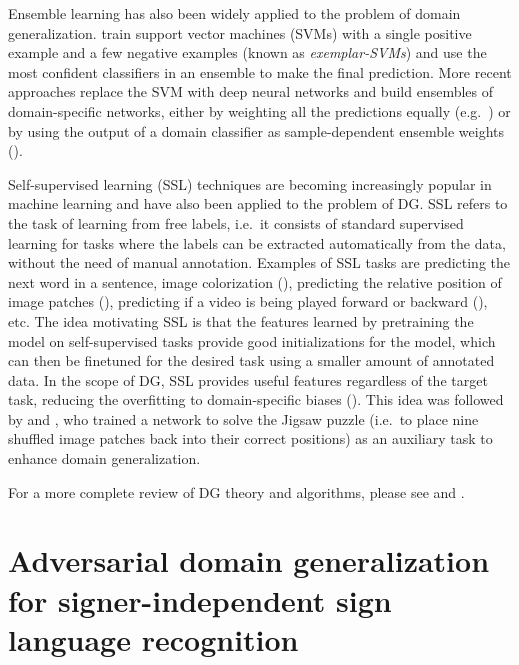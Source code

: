 Ensemble learning has also been widely applied to the problem of domain generalization. \citet{Zheng2014} train support vector machines (SVMs) with a single positive example and a few negative examples (known as \emph{exemplar-SVMs}) and use the most confident classifiers in an ensemble to make the final prediction. More recent approaches replace the SVM with deep neural networks and build ensembles of domain-specific networks, either by weighting all the predictions equally (e.g.\ \citet{Innocente2018, Zhou2020}) or by using the output of a domain classifier as sample-dependent ensemble weights (\citet{Wang2020a}).

Self-supervised learning (SSL) techniques are becoming increasingly popular in machine learning and have also been applied to the problem of DG. SSL refers to the task of learning from free labels, i.e.\ it consists of standard supervised learning for tasks where the labels can be extracted automatically from the data, without the need of manual annotation. Examples of SSL tasks are predicting the next word in a sentence, image colorization (\citet{Zhang2016}), predicting the relative position of image patches (\citet{Doersch2015}), predicting if a video is being played forward or backward (\citet{Wei2018}), etc. The idea motivating SSL is that the features learned by pretraining the model on self-supervised tasks provide good initializations for the model, which can then be finetuned for the desired task using a smaller amount of annotated data. In the scope of DG, SSL provides useful features regardless of the target task, reducing the overfitting to domain-specific biases (\citet{Zhou2021}). This idea was followed by \citet{Carlucci2019} and \citet{Wang2020b}, who trained a network to solve the Jigsaw puzzle (i.e.\ to place nine shuffled image patches back into their correct positions) as an auxiliary task to enhance domain generalization.

For a more complete review of DG theory and algorithms, please see \citet{Wang2021} and \citet{Zhou2021}.

\section{Adversarial domain generalization for signer-independent sign language recognition}
\label{sec:adv_signer_inv}

